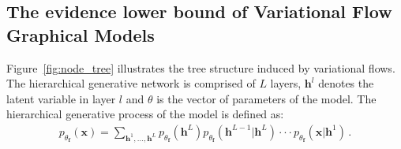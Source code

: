 \documentclass{article} %
\begin{document}
\subsection{The evidence lower bound of Variational Flow Graphical Models}
Figure~\ref{fig:node_tree} illustrates the tree structure induced by variational flows.  
The hierarchical generative network is comprised of $L$ layers, $\mathbf{h}^l$ denotes the latent variable in layer $l$ and $\theta$ is the vector of parameters of the model. 
The hierarchical generative process of the model is defined as:
\begin{align*}
p_{\theta_{\mathbf{f}}}(\mathbf{x}) = \sum_{\mathbf{h}^1, ..., \mathbf{h}^L} p_{\theta_{\mathbf{f}}}(\mathbf{h}^L)p_{\theta_{\mathbf{f}}}(\mathbf{h}^{L-1} | \mathbf{h}^{L}) \cdot \cdot  \cdot  p_{\theta_{\mathbf{f}}}(\mathbf{x} | \mathbf{h}^{1}) \, .
\end{align*}
\end{document}
